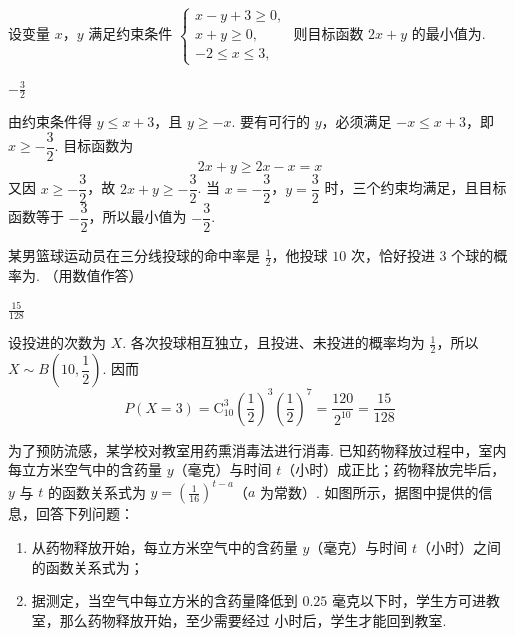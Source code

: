 \begin{problem}
设变量 \(x\)，\(y\) 满足约束条件 \(\begin{cases}
x - y + 3 \geqslant 0,\\
x + y \geqslant 0,\\
-2 \leqslant x \leqslant 3,
\end{cases}\) 则目标函数 \(2x + y\) 的最小值为\fillinblank{}.
\end{problem}

\begin{answer}
\(-\frac{3}{2}\)
\end{answer}

\begin{solution}
由约束条件得 \(y\leqslant x+3\)，且 \(y\geqslant-x\). 要有可行的 \(y\)，必须满足 \(-x\leqslant x+3\)，即 \(x\geqslant-\dfrac32\). 目标函数为
\[
2x+y\geqslant2x-x=x
\]
又因 \(x\geqslant-\dfrac32\)，故 \(2x+y\geqslant-\dfrac32\). 当 \(x=-\dfrac32\)，\(y=\dfrac32\) 时，三个约束均满足，且目标函数等于 \(-\dfrac32\)，所以最小值为 \(-\dfrac32\).
\end{solution}

\begin{problem}
某男篮球运动员在三分线投球的命中率是 \(\frac{1}{2}\)，他投球 \(10\) 次，恰好投进 \(3\) 个球的概率为\fillinblank{}. （用数值作答）
\end{problem}

\begin{answer}
\(\frac{15}{128}\)
\end{answer}

\begin{solution}
设投进的次数为 \(X\). 各次投球相互独立，且投进、未投进的概率均为 \(\frac{1}{2}\)，所以 \(X\sim B\left(10,\dfrac12\right)\). 因而
\[
P(X=3)=\mathrm C_{10}^{3}\left(\frac12\right)^3\left(\frac12\right)^7=\frac{120}{2^{10}}=\frac{15}{128}
\]
\end{solution}

\begin{problem}
为了预防流感，某学校对教室用药熏消毒法进行消毒. 已知药物释放过程中，室内每立方米空气中的含药量 \(y\)（毫克）与时间 \(t\)（小时）成正比；药物释放完毕后，\(y\) 与 \(t\) 的函数关系式为 \(y = \left(\frac{1}{16}\right)^{t - a}\)（\(a\) 为常数）. 如图所示，据图中提供的信息，回答下列问题：

\begin{enumerate}
\item 从药物释放开始，每立方米空气中的含药量 \(y\)（毫克）与时间 \(t\)（小时）之间的函数关系式为\fillinblank{}；
\item 据测定，当空气中每立方米的含药量降低到 \(0.25\) 毫克以下时，学生方可进教室，那么药物释放开始，至少需要经过\fillinblank{} 小时后，学生才能回到教室.
\end{enumerate}

\end{problem}

